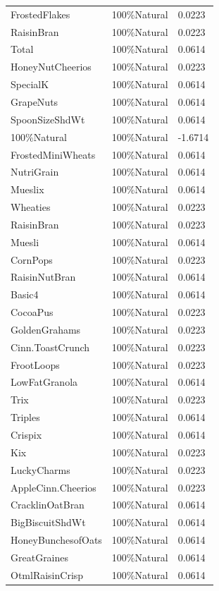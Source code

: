 \begin{table}[!htbp]
\begin{tabular}{lll}
\\
FrostedFlakes & 100\%Natural & 0.0223
\\
RaisinBran & 100\%Natural & 0.0223
\\
Total & 100\%Natural & 0.0614
\\
HoneyNutCheerios & 100\%Natural & 0.0223
\\
SpecialK & 100\%Natural & 0.0614
\\
GrapeNuts & 100\%Natural & 0.0614
\\
SpoonSizeShdWt & 100\%Natural & 0.0614
\\
100\%Natural & 100\%Natural & -1.6714
\\
FrostedMiniWheats & 100\%Natural & 0.0614
\\
NutriGrain & 100\%Natural & 0.0614
\\
Mueslix & 100\%Natural & 0.0614
\\
Wheaties & 100\%Natural & 0.0223
\\
RaisinBran & 100\%Natural & 0.0223
\\
Muesli & 100\%Natural & 0.0614
\\
CornPops & 100\%Natural & 0.0223
\\
RaisinNutBran & 100\%Natural & 0.0614
\\
Basic4 & 100\%Natural & 0.0614
\\
CocoaPus & 100\%Natural & 0.0223
\\
GoldenGrahams & 100\%Natural & 0.0223
\\
Cinn.ToastCrunch & 100\%Natural & 0.0223
\\
FrootLoops & 100\%Natural & 0.0223
\\
LowFatGranola & 100\%Natural & 0.0614
\\
Trix & 100\%Natural & 0.0223
\\
Triples & 100\%Natural & 0.0614
\\
Crispix & 100\%Natural & 0.0614
\\
Kix & 100\%Natural & 0.0223
\\
LuckyCharms & 100\%Natural & 0.0223
\\
AppleCinn.Cheerios & 100\%Natural & 0.0223
\\
CracklinOatBran & 100\%Natural & 0.0614
\\
BigBiscuitShdWt & 100\%Natural & 0.0614
\\
HoneyBunchesofOats & 100\%Natural & 0.0614
\\
GreatGraines & 100\%Natural & 0.0614
\\
OtmlRaisinCrisp & 100\%Natural & 0.0614

\end{tabular}
\end{table}

